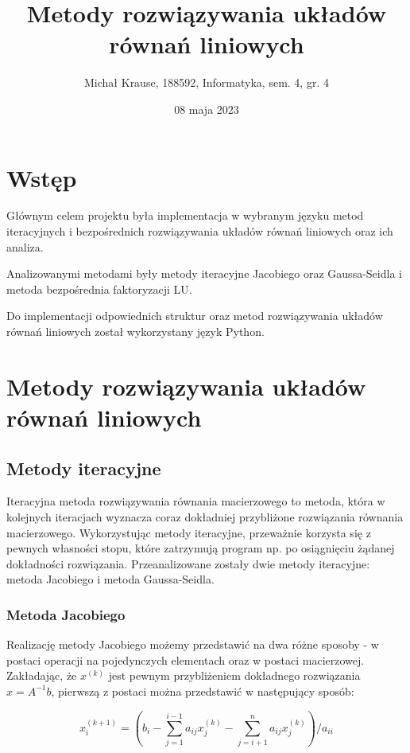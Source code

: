 \documentclass{article}
\title{Metody rozwiązywania układów równań liniowych}
\author{Michał Krause, 188592, Informatyka, sem. 4, gr. 4}
\date{08 maja 2023}
\begin{document}
\maketitle

\section{Wstęp}

Głównym celem projektu była implementacja w wybranym języku metod iteracyjnych i bezpośrednich rozwiązywania układów równań liniowych oraz ich analiza.

Analizowanymi metodami były metody iteracyjne Jacobiego oraz Gaussa-Seidla i metoda bezpośrednia faktoryzacji LU.

Do implementacji odpowiednich struktur oraz metod rozwiązywania układów równań liniowych został wykorzystany język Python.

\section{Metody rozwiązywania układów równań liniowych}

\subsection{Metody iteracyjne}

Iteracyjna metoda rozwiązywania równania macierzowego to metoda, która w kolejnych iteracjach wyznacza coraz dokładniej przybliżone rozwiązania równania macierzowego. Wykorzystując metody iteracyjne, przeważnie korzysta się z pewnych własności stopu, które zatrzymują program np. po osiągnięciu żądanej dokładności rozwiązania. Przeanalizowane zostały dwie metody iteracyjne: metoda Jacobiego i metoda Gaussa-Seidla.

\subsubsection{Metoda Jacobiego}

Realizację metody Jacobiego możemy przedstawić na dwa różne sposoby - w postaci operacji na pojedynczych elementach oraz w postaci macierzowej. Zakładając, że $x^{(k)}$ jest pewnym przybliżeniem dokładnego rozwiązania $x=A^{-1}b$, pierwszą z postaci można przedstawić w następujący sposób:

\[x_{i}^{(k+1)} = (b_{i} - \sum_{j=1}^{i-1} a_{ij}x_{j}^{(k)} - \sum_{j=i+1}^{n} a_{ij}x_{j}^{(k)}) / a_{ii}\]
\end{document}
